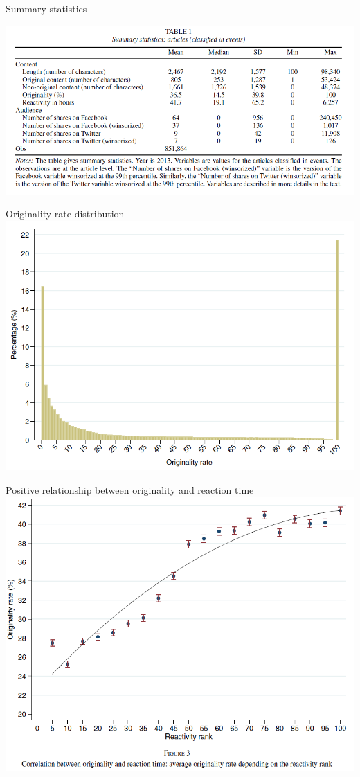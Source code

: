 \documentclass[english]{beamer}
\begin{document}
\begin{frame}{Summary statistics}
\begin{center}
\includegraphics[width=1.05\textwidth]{Images/cage-1.PNG}
\end{center}
\end{frame}
%

\begin{frame}{Originality rate distribution}
    \includegraphics[width=1\textwidth]{Images/cage-5.PNG}
\end{frame}
%

\begin{frame}{Positive relationship between originality and reaction time}
    \includegraphics[width=1\textwidth]{Images/cage-2.PNG}
\end{frame}
\end{document}
